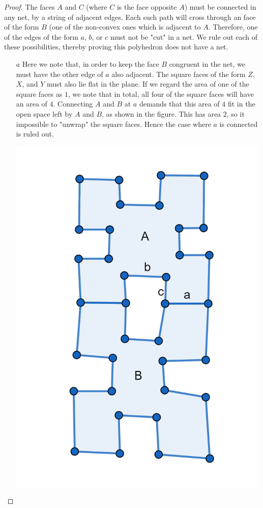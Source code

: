 \documentclass[12pt]{article}
\theoremstyle{definition}
\begin{document}
\begin{proof}

The faces $A$ and $C$ (where $C$ is the face opposite $A$) must be connected in any net, by a string of adjacent edges. Each such path will cross through an face of the form $B$ (one of the non-convex ones which is adjacent to $A$. Therefore, one of the edges of the form $a$, $b$, or $c$ must not be "cut" in a net. We rule out each of these possibilities, thereby proving this polyhedron does not have a net.

\begin{itemize}
\item[$a$] Here we note that, in order to keep the face $B$ congruent in the net, we must have the other edge of $a$ also adjacent. The square faces of the form $Z$, $X$, and $Y$ must also lie flat in the plane. If we regard the area of one of the square faces as $1$, we note that in total, all four of the square faces will have an area of $4$. Connecting $A$ and $B$ at $a$ demands that this area of $4$ fit in the open space left by $A$ and $B$, as shown in the figure. This has area $2$, so it impossible to "unwrap" the square faces. Hence the case where $a$ is connected is ruled out.

\includegraphics[scale=1]{unfolded_a.png} 


\end{itemize}
\end{proof}
\end{document}
